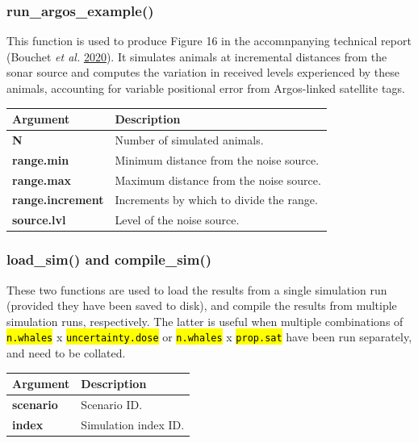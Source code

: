 \documentclass[
]{article}
\begin{document}
\subsubsection{run\_argos\_example()}

This function is used to produce Figure 16 in the accomnpanying technical report (Bouchet \emph{et al.} \protect\hyperlink{ref-Bouchet2020a}{2020}). It simulates animals at incremental distances from the sonar source and computes the variation in received levels experienced by these animals, accounting for variable positional error from Argos-linked satellite tags.

\renewcommand{\arraystretch}{1.4}

\begin{table}[H]
\centering
\begin{tabular}{>{\bfseries}l|>{\raggedright\arraybackslash}p{30em}}
\toprule
\textbf{Argument} & \textbf{Description}\\
\midrule
N & Number of simulated animals.\\
range.min & Minimum distance from the noise source.\\
range.max & Maximum distance from the noise source.\\
range.increment & Increments by which to divide the range.\\
source.lvl & Level of the noise source.\\
\bottomrule
\end{tabular}
\end{table}

\subsubsection{load\_sim() and compile\_sim()}

\hypertarget{compilelink}{}

These two functions are used to load the results from a single simulation run (provided they have been saved to disk), and compile the results from multiple simulation runs, respectively. The latter is useful when multiple combinations of \textcolor{codecolor}{\texttt{\hl{n.whales}}} x \textcolor{codecolor}{\texttt{\hl{uncertainty.dose}}} or \textcolor{codecolor}{\texttt{\hl{n.whales}}} x \textcolor{codecolor}{\texttt{\hl{prop.sat}}} have been run separately, and need to be collated.

\renewcommand{\arraystretch}{1.4}
\begin{table}[H]
\centering
\begin{tabular}{>{\bfseries}l|>{\raggedright\arraybackslash}p{30em}}
\toprule
\textbf{Argument} & \textbf{Description}\\
\midrule
scenario & Scenario ID.\\
index & Simulation index ID.\\
\bottomrule
\end{tabular}
\end{table}
\end{document}
